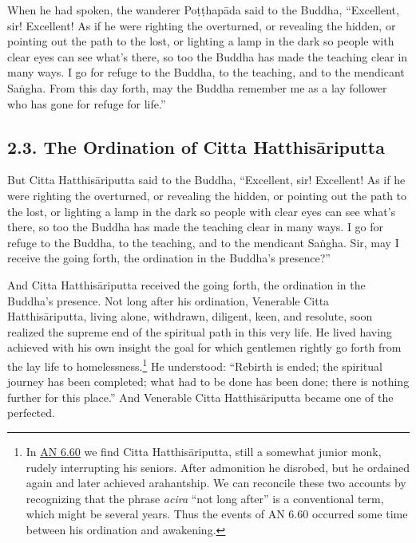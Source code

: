 \documentclass[12pt,openany]{book}%
\begin{document}
When he had spoken, the wanderer \textsanskrit{Poṭṭhapāda} said to the Buddha, “Excellent, sir! Excellent! As if he were righting the overturned, or revealing the hidden, or pointing out the path to the lost, or lighting a lamp in the dark so people with clear eyes can see what’s there, so too the Buddha has made the teaching clear in many ways. I go for refuge to the Buddha, to the teaching, and to the mendicant \textsanskrit{Saṅgha}. From this day forth, may the Buddha remember me as a lay follower who has gone for refuge for life.” 

\subsection*{2.3. The Ordination of Citta \textsanskrit{Hatthisāriputta} }

But Citta \textsanskrit{Hatthisāriputta} said to the Buddha, “Excellent, sir! Excellent! As if he were righting the overturned, or revealing the hidden, or pointing out the path to the lost, or lighting a lamp in the dark so people with clear eyes can see what’s there, so too the Buddha has made the teaching clear in many ways. I go for refuge to the Buddha, to the teaching, and to the mendicant \textsanskrit{Saṅgha}. Sir, may I receive the going forth, the ordination in the Buddha’s presence?” 

And Citta \textsanskrit{Hatthisāriputta} received the going forth, the ordination in the Buddha’s presence. Not long after his ordination, Venerable Citta \textsanskrit{Hatthisāriputta}, living alone, withdrawn, diligent, keen, and resolute, soon realized the supreme end of the spiritual path in this very life. He lived having achieved with his own insight the goal for which gentlemen rightly go forth from the lay life to homelessness.\footnote{In \href{https://suttacentral.net/an6.60/en/sujato}{AN 6.60} we find Citta \textsanskrit{Hatthisāriputta}, still a somewhat junior monk, rudely interrupting his seniors. After admonition he disrobed, but he ordained again and later achieved arahantship. We can reconcile these two accounts by recognizing that the phrase \textit{acira} “not long after” is a conventional term, which might be several years. Thus the events of AN 6.60 occurred some time between his ordination and awakening. } He understood: “Rebirth is ended; the spiritual journey has been completed; what had to be done has been done; there is nothing further for this place.” And Venerable Citta \textsanskrit{Hatthisāriputta} became one of the perfected. 
\end{document}
